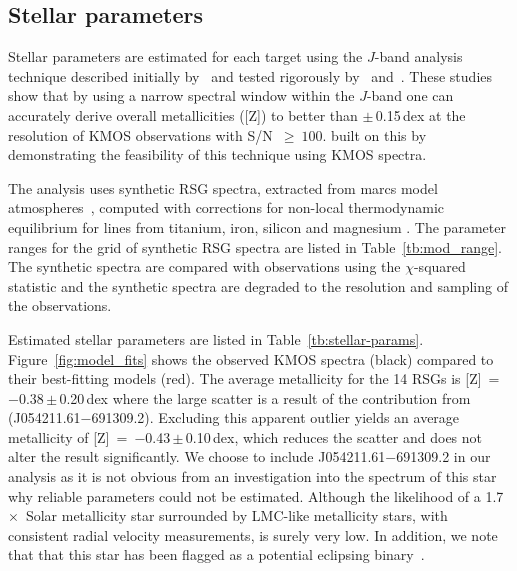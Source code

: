 \documentclass[useAMS,usenatbib]{mn2e}
\begin{document}

\subsection{Stellar parameters} %
\label{sub:stellar_parameters}

Stellar parameters are estimated for each target using the $J$-band analysis technique described initially by~\cite{2010MNRAS.407.1203D}
and tested rigorously by~\cite{2014ApJ...788...58G} and~\cite{2015ApJ...806...21D}.
These studies show that by using a narrow spectral window within the $J$-band one can accurately derive overall metallicities ([Z]) to better than
$\pm$\,0.15\,dex at the resolution of KMOS observations with S/N~$\ge~100$.
\cite{2015ApJ...803...14P} built on this by demonstrating the feasibility of this technique using KMOS spectra.

The analysis uses synthetic RSG spectra, extracted from {\sc marcs} model atmospheres~\citep{2008A&A...486..951G},
computed with corrections for non-local thermodynamic equilibrium for lines from titanium, iron, silicon and magnesium
\citep{2012ApJ...751..156B,2013ApJ...764..115B,2015ApJ...804..113B}.
The parameter ranges for the grid of synthetic RSG spectra are listed in Table~\ref{tb:mod_range}.
The synthetic spectra are compared with observations using the $\chi$-squared statistic and the synthetic spectra are degraded to the resolution and sampling of the observations.

Estimated stellar parameters are listed in Table~\ref{tb:stellar-params}.
Figure~\ref{fig:model_fits} shows the observed KMOS spectra (black) compared to their best-fitting models (red).
The average metallicity for the 14 RSGs is [Z]~=~$-$0.38\,$\pm$\,0.20\,dex where the large scatter is a result of the contribution from (J054211.61$-$691309.2).
Excluding this apparent outlier yields an average metallicity of [Z]~=~$-$0.43\,$\pm$\,0.10\,dex, which reduces the scatter and does not alter the result significantly.
We choose to include J054211.61$-$691309.2 in our analysis as it is not obvious from an investigation into the spectrum of this star why reliable parameters could not be estimated.
Although the likelihood of a 1.7~$\times$~Solar metallicity star surrounded by LMC-like metallicity stars, with consistent radial velocity measurements, is surely very low.
In addition, we note that that this star has been flagged as a potential eclipsing binary~\citep{1979MNRAS.186..831F}.
\end{document}
